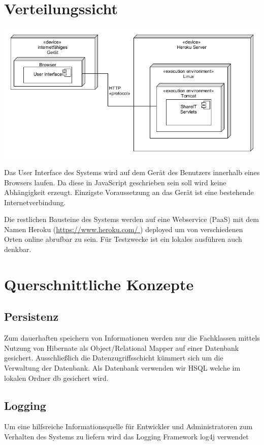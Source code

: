 \documentclass[]{report}
\begin{document}
\newpage

\section{Verteilungssicht}\label{section-deployment-view}
\begin{center}
\includegraphics{images/Verteilungssicht.png}
\end{center}
Das User Interface des Systems wird auf dem Gerät des Benutzers innerhalb eines Browsers laufen.
Da diese in JavaScript geschrieben sein soll wird keine Abhängigkeit erzeugt. 
Einzigste Voraussetzung an das Gerät ist eine bestehende Internetverbindung.

Die restlichen Bausteine des Systems werden auf eine Webservice (PaaS) mit dem Namen Heroku (\url{https://www.heroku.com/ }) deployed
um von verschiedenen Orten online abrufbar zu sein.
Für Testzwecke ist ein lokales ausführen auch denkbar.

\newpage

\section{Querschnittliche Konzepte}\label{section-concepts}

\subsection{Persistenz}
Zum dauerhaften speichern von Informationen werden nur die Fachklassen mittels
Nutzung von Hibernate als Object/Relational Mapper auf einer Datenbank gesichert.
Ausschließlich die Datenzugriffsschicht kümmert sich um die Verwaltung der Datenbank.
Als Datenbank verwenden wir HSQL welche im lokalen Ordner db gesichert wird.

\subsection{Logging}
Um eine hilfsreiche Informationsquelle für Entwickler und Administratoren zum Verhalten des Systems zu liefern wird
das Logging Framework log4j verwendet
\end{document}
